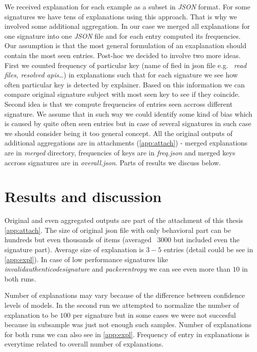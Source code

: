 We received explanation for each example as a subset in \emph{JSON} format. For some signatures we have tens of explanations using this approach. That is why we involved some additional aggregation. In our case we merged all explanations for one signature into one \emph{JSON} file and for each entry computed its frequencies. Our assumption is that the most general formulation of an exaplanation should contain the most seen entries. Post-hoc we decided to involve two more ideas. First we counted frequency of particular key (name of fied in json file e.g. \ \emph{read files, resolved apis}\dots) in explanations such that for each signature we see how often particular key is detected by explainer. Based on this information we can compare original signature subject with most seen key to see if they coincide. Second idea is that we compute frequencies of entries seen accross different signature. We assume that in such way we could identify some kind of bias which is caused by quite often seen entries but in case of several signatures in such case we should consider being it too general concept. All the original outputs of additional aggregations are in attachments (\ref{app:attach}) - merged explanations are in \emph{merged} directory, frequencies of keys are in \emph{freq.json} and merged keys accross signatures are in \emph{overall.json}. Parts of results we discuss below.



\section{Results and discussion}
Original and even aggregated outputs are part of the attachment of this thesis \ref{app:attach}. The size of original json file with only behavioral part can be hundreds but even thousands of items (averaged \texttildelow~$3000$ but included even the signature part). Average size of explanation is $3-5$ entries (detail could be see in \ref{app:expl}). In case of low performance signatures like \emph{invalidauthenticodesignature} and \emph{packerentropy} we can see even more than $10$ in both runs.

Number of explanations may vary because of the difference between confidence levels of models. In the second run we attempted to normalize the number of explanation to be $100$ per signature but in some cases we were not succesful because in subsample was just not enough such samples. Number of explanations for both runs we can also see in \ref{app:expl}. Frequency of entry in explanations is everytime related to overall number of explanations.


